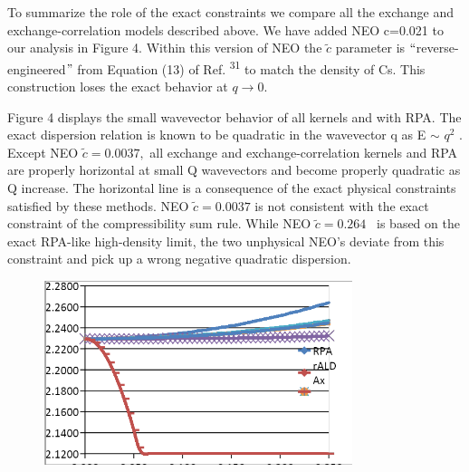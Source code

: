 \documentclass[12pt]{article}
\renewcommand{\_}{\kern-1.5pt\textunderscore\kern-1.5pt}
\begin{document}
\vspace{\baselineskip}
\setlength{\parskip}{0.0pt}
\setlength{\parskip}{9.96pt}
\setlength{\parskip}{0.0pt}
\begin{justify}
To summarize the role of the exact constraints we compare all the exchange and exchange-correlation models described above. We have added NEO c=0.021 to our analysis in Figure 4. Within this version of NEO the  \( \widetilde{c} \)  parameter is $``$reverse-engineered$"$  from Equation (13) of Ref. \textsuperscript{31} to match the density of Cs. This construction loses the exact behavior at  \( q \rightarrow 0. \) 
\end{justify}\par

\begin{justify}
Figure 4 displays the small wavevector behavior of all kernels and with RPA. The exact dispersion relation is known to be quadratic in the wavevector q as E $ \sim $   \( q^{2} \) . Except NEO  \( \widetilde{c}=0.0037, \)  all exchange and exchange-correlation kernels and RPA are properly horizontal at small Q wavevectors and become properly quadratic as Q increase. The horizontal line is a consequence of the exact physical constraints satisfied by these methods. NEO  \( \widetilde{c}=0.0037 \)  is not consistent with the exact constraint of the compressibility sum rule. While NEO  \( \widetilde{c}=0.264 \) \ is based on the exact RPA-like high-density limit, the two unphysical NEO’s deviate from this constraint and pick up a wrong negative quadratic dispersion.  
\end{justify}\par


\vspace{\baselineskip}
\setlength{\parskip}{9.96pt}



\begin{figure}[H]
	\begin{Center}
		\includegraphics[width=3.55in,height=2.12in]{./media/image7.png}
	\end{Center}
\end{figure}
\end{document}
